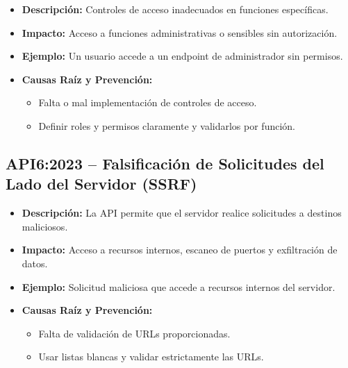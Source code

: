 \documentclass[a4paper,12pt]{article}
\begin{document}
\begin{itemize}
    \item \textbf{Descripción:} Controles de acceso inadecuados en funciones específicas.
    \item \textbf{Impacto:} Acceso a funciones administrativas o sensibles sin autorización.
    \item \textbf{Ejemplo:} Un usuario accede a un endpoint de administrador sin permisos.
    \item \textbf{Causas Raíz y Prevención:}
    \begin{itemize}
        \item Falta o mal implementación de controles de acceso.
        \item Definir roles y permisos claramente y validarlos por función.
    \end{itemize}
\end{itemize}

\subsection{API6:2023 – Falsificación de Solicitudes del Lado del Servidor (SSRF)}

\begin{itemize}
    \item \textbf{Descripción:} La API permite que el servidor realice solicitudes a destinos maliciosos.
    \item \textbf{Impacto:} Acceso a recursos internos, escaneo de puertos y exfiltración de datos.
    \item \textbf{Ejemplo:} Solicitud maliciosa que accede a recursos internos del servidor.
    \item \textbf{Causas Raíz y Prevención:}
    \begin{itemize}
        \item Falta de validación de URLs proporcionadas.
        \item Usar listas blancas y validar estrictamente las URLs.
    \end{itemize}
\end{itemize}
\end{document}
